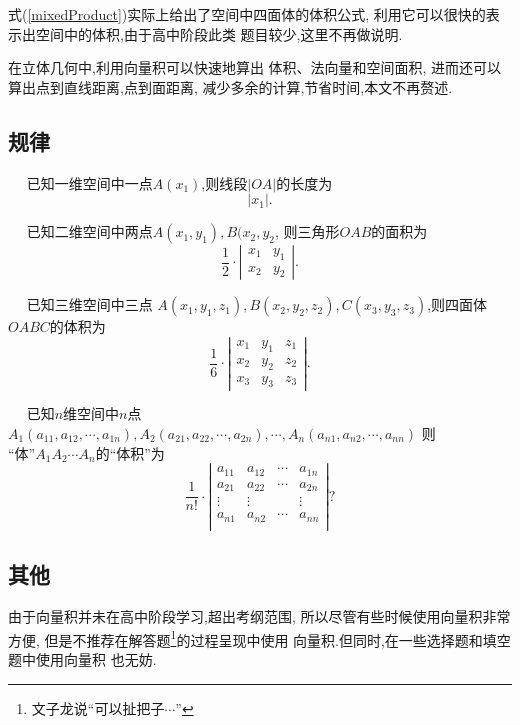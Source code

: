 式(\ref{mixedProduct})实际上给出了空间中四面体的体积公式,
利用它可以很快的表示出空间中的体积,由于高中阶段此类
题目较少,这里不再做说明.

在立体几何中,利用向量积可以快速地算出
体积、法向量和空间面积,
进而还可以算出点到直线距离,点到面距离,
减少多余的计算,节省时间,本文不再赘述.


\subsection{规律}

$\quad$ 已知一维空间中一点$A(x_1)$,则线段$|OA|$的长度为
$$ 
\left|x_1\right|.
$$

$\quad$ 已知二维空间中两点$A(x_1,y_1),B(x_2,y_2$,
则三角形$OAB$的面积为
$$ 
\frac{1}{2}\cdot
\left|
\begin{array}{cc}
  x_1&y_1\\
  x_2&y_2
\end{array}
\right|.
$$

$\quad$ 已知三维空间中三点
$A(x_1,y_1,z_1),B(x_2,y_2,z_2),C(x_3,y_3,z_3)$,则四面体$OABC$的体积为
$$
\frac{1}{6}\cdot
\left|
\begin{array}{ccc}
  x_1&y_1&z_1\\
  x_2&y_2&z_2\\
  x_3&y_3&z_3
\end{array}
\right|. 
$$

$\quad$ 已知$n$维空间中$n$点
$A_1(a_{11},a_{12},\cdots,a_{1n}),
A_2(a_{21},a_{22},\cdots,a_{2n}),
\cdots,A_n(a_{n1},a_{n2},\cdots,a_{nn})$
则\\``体''$A_1A_2\cdots A_n$的``体积''为
$$
\frac{1}{n!}\cdot
\left|
\begin{array}{cccc}
  a_{11}&a_{12}&\cdots&a_{1n}\\
  a_{21}&a_{22}&\cdots&a_{2n}\\
  \vdots&\vdots&      &\vdots\\
  a_{n1}&a_{n2}&\cdots&a_{nn}\\
\end{array}
\right|? 
$$

\subsection{其他}
由于向量积并未在高中阶段学习,超出考纲范围,
所以尽管有些时候使用向量积非常方便,
但是不推荐在解答题\footnote{文子龙说``可以扯把子$\cdots$''}的过程呈现中使用
向量积.但同时,在一些选择题和填空题中使用向量积
也无妨.

